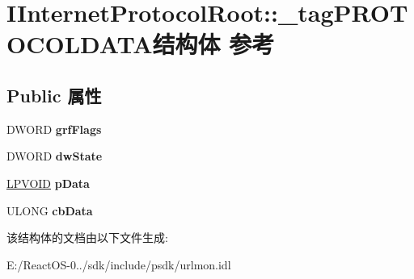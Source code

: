 \hypertarget{struct_i_internet_protocol_root_1_1__tag_p_r_o_t_o_c_o_l_d_a_t_a}{}\section{I\+Internet\+Protocol\+Root\+:\+:\+\_\+tag\+P\+R\+O\+T\+O\+C\+O\+L\+D\+A\+T\+A结构体 参考}
\label{struct_i_internet_protocol_root_1_1__tag_p_r_o_t_o_c_o_l_d_a_t_a}
\subsection*{Public 属性}
\begin{DoxyCompactItemize}
\item 
\mbox{\label{struct_i_internet_protocol_root_1_1__tag_p_r_o_t_o_c_o_l_d_a_t_a_a9d45f6462d9ad9cc9e927623ef9b6644}} 
D\+W\+O\+RD {\bfseries grf\+Flags}
\item 
\mbox{\label{struct_i_internet_protocol_root_1_1__tag_p_r_o_t_o_c_o_l_d_a_t_a_ad707317a95d459c95bc5cd523925f4f3}} 
D\+W\+O\+RD {\bfseries dw\+State}
\item 
\mbox{\label{struct_i_internet_protocol_root_1_1__tag_p_r_o_t_o_c_o_l_d_a_t_a_a68ebfc42499328f2311603fa607e7b0c}} 
\hyperlink{interfacevoid}{L\+P\+V\+O\+ID} {\bfseries p\+Data}
\item 
\mbox{\label{struct_i_internet_protocol_root_1_1__tag_p_r_o_t_o_c_o_l_d_a_t_a_a1cdfdd23c72b57c1b646db80deb951c2}} 
U\+L\+O\+NG {\bfseries cb\+Data}
\end{DoxyCompactItemize}


该结构体的文档由以下文件生成\+:\begin{DoxyCompactItemize}
\item 
E\+:/\+React\+O\+S-\/0../sdk/include/psdk/urlmon.\+idl\end{DoxyCompactItemize}
